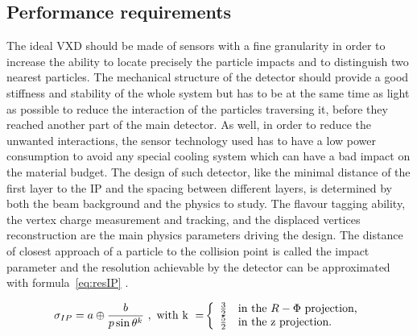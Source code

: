   \subsection{Performance requirements}
   
   The ideal \gls{VXD} should be made of sensors with a fine granularity in order to increase the ability to locate precisely the particle impacts and to distinguish two nearest particles.
   The mechanical structure of the detector should provide a good stiffness and stability of the whole system but has to be at the same time as light as possible to reduce the interaction of the particles traversing it, before they reached another part of the main detector.
   As well, in order to reduce the unwanted interactions, the sensor technology used has to have a low power consumption to avoid any special cooling system which can have a bad impact on the material budget.
   The design of such detector, like the minimal distance of the first layer to the \gls{IP} and the spacing between different layers, is determined by both the beam background and the physics to study.
   The flavour tagging ability, the vertex charge measurement and tracking, and the displaced vertices reconstruction are the main physics parameters driving the design.
   The distance of closest approach of a particle to the collision point is called the impact parameter and the resolution achievable by the detector can be approximated with formula~\ref{eq:resIP} \cite{Battaglia2011}.
    
    \begin{equation}
      \sigma_{IP} = a \oplus \frac{b}{p \sin{\theta}^{k}}~\rm{,~with~k~=}
      \left\{
        \begin{array}{r l}
          \frac{3}{2} & \text{in the } R - \Phi \text{ projection,} \\
          \frac{5}{2} & \text{in the z projection.}
        \end{array}
      \right. 
      \label{eq:resIP}
    \end{equation}

